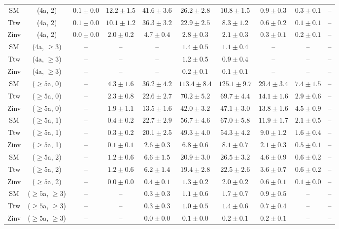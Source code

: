 \begin{table}[h!]
{\begin{tabular}{cccccccccc}
	SM & (4a, 2) & $0.1\pm 0.0$ & $12.2\pm 1.5$ & $41.6\pm 3.6$ & $26.2\pm 2.8$ & $10.8\pm 1.5$ & $0.9\pm 0.3$ & $0.3\pm 0.1$ & -- \\[0.5ex] 
	Ttw & (4a, 2) & $0.1\pm 0.0$ & $10.1\pm 1.2$ & $36.3\pm 3.2$ & $22.9\pm 2.5$ & $8.3\pm 1.2$ & $0.6\pm 0.2$ & $0.1\pm 0.1$ & -- \\[0.5ex] 
	Zinv & (4a, 2) & $0.0\pm 0.0$ & $2.0\pm 0.2$ & $4.7\pm 0.4$ & $2.8\pm 0.3$ & $2.1\pm 0.3$ & $0.3\pm 0.1$ & $0.2\pm 0.1$ & -- \\[0.5ex] 
	SM & (4a, $\ge3$) & -- & -- & -- & $1.4\pm 0.5$ & $1.1\pm 0.4$ & -- & -- & -- \\[0.5ex] 
	Ttw & (4a, $\ge3$) & -- & -- & -- & $1.2\pm 0.5$ & $0.9\pm 0.4$ & -- & -- & -- \\[0.5ex] 
	Zinv & (4a, $\ge3$) & -- & -- & -- & $0.2\pm 0.1$ & $0.1\pm 0.1$ & -- & -- & -- \\[0.5ex] 
	SM & ($\ge5$a, 0) & -- & $4.3\pm 1.6$ & $36.2\pm 4.2$ & $113.4\pm 8.4$ & $125.1\pm 9.7$ & $29.4\pm 3.4$ & $7.4\pm 1.5$ & -- \\[0.5ex] 
	Ttw & ($\ge5$a, 0) & -- & $2.3\pm 0.8$ & $22.6\pm 2.7$ & $70.2\pm 5.2$ & $69.7\pm 4.4$ & $14.1\pm 1.6$ & $2.9\pm 0.6$ & -- \\[0.5ex] 
	Zinv & ($\ge5$a, 0) & -- & $1.9\pm 1.1$ & $13.5\pm 1.6$ & $42.0\pm 3.2$ & $47.1\pm 3.0$ & $13.8\pm 1.6$ & $4.5\pm 0.9$ & -- \\[0.5ex] 
	SM & ($\ge5$a, 1) & -- & $0.4\pm 0.2$ & $22.7\pm 2.9$ & $56.7\pm 4.6$ & $67.0\pm 5.8$ & $11.9\pm 1.7$ & $2.1\pm 0.5$ & -- \\[0.5ex] 
	Ttw & ($\ge5$a, 1) & -- & $0.3\pm 0.2$ & $20.1\pm 2.5$ & $49.3\pm 4.0$ & $54.3\pm 4.2$ & $9.0\pm 1.2$ & $1.6\pm 0.4$ & -- \\[0.5ex] 
	Zinv & ($\ge5$a, 1) & -- & $0.1\pm 0.1$ & $2.6\pm 0.3$ & $6.8\pm 0.6$ & $8.1\pm 0.7$ & $2.1\pm 0.3$ & $0.5\pm 0.1$ & -- \\[0.5ex] 
	SM & ($\ge5$a, 2) & -- & $1.2\pm 0.6$ & $6.6\pm 1.5$ & $20.9\pm 3.0$ & $26.5\pm 3.2$ & $4.6\pm 0.9$ & $0.6\pm 0.2$ & -- \\[0.5ex] 
	Ttw & ($\ge5$a, 2) & -- & $1.2\pm 0.6$ & $6.2\pm 1.4$ & $19.4\pm 2.8$ & $22.5\pm 2.6$ & $3.6\pm 0.7$ & $0.6\pm 0.2$ & -- \\[0.5ex] 
	Zinv & ($\ge5$a, 2) & -- & $0.0\pm 0.0$ & $0.4\pm 0.1$ & $1.3\pm 0.2$ & $2.0\pm 0.2$ & $0.6\pm 0.1$ & $0.1\pm 0.0$ & -- \\[0.5ex] 
	SM & ($\ge5$a, $\ge3$) & -- & -- & $0.3\pm 0.3$ & $1.1\pm 0.6$ & $1.7\pm 0.7$ & $0.9\pm 0.5$ & -- & -- \\[0.5ex] 
	Ttw & ($\ge5$a, $\ge3$) & -- & -- & $0.3\pm 0.3$ & $1.0\pm 0.5$ & $1.4\pm 0.6$ & $0.7\pm 0.4$ & -- & -- \\[0.5ex] 
	Zinv & ($\ge5$a, $\ge3$) & -- & -- & $0.0\pm 0.0$ & $0.1\pm 0.0$ & $0.2\pm 0.1$ & $0.2\pm 0.1$ & -- & -- \\[0.5ex] 
	\hline
	\hline
\end{tabular}}
\end{table}
